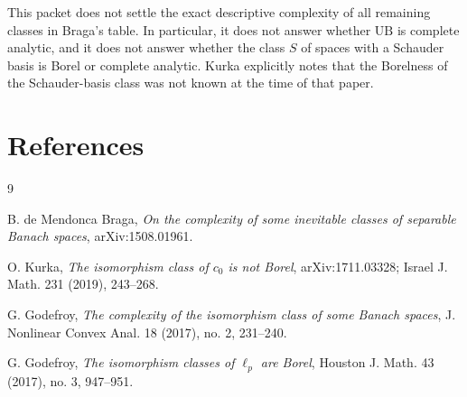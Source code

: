 \documentclass[11pt]{article}
\begin{document}
This packet does not settle the exact descriptive complexity of all
remaining classes in Braga's table.  In particular, it does not answer
whether \(\mathrm{UB}\) is complete analytic, and it does not answer
whether the class \(S\) of spaces with a Schauder basis is Borel or
complete analytic.  Kurka explicitly notes that the Borelness of the
Schauder-basis class was not known at the time of that paper.

\section*{References}

\begin{thebibliography}{9}

B. de Mendonca Braga,
\emph{On the complexity of some inevitable classes of separable Banach spaces},
arXiv:1508.01961.

O. Kurka,
\emph{The isomorphism class of \(c_0\) is not Borel},
arXiv:1711.03328; Israel J. Math. 231 (2019), 243--268.

G. Godefroy,
\emph{The complexity of the isomorphism class of some Banach spaces},
J. Nonlinear Convex Anal. 18 (2017), no. 2, 231--240.

G. Godefroy,
\emph{The isomorphism classes of \(\ell_p\) are Borel},
Houston J. Math. 43 (2017), no. 3, 947--951.

\end{thebibliography}
\end{document}
